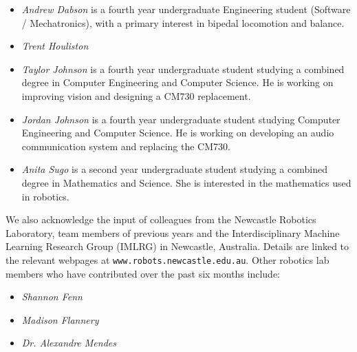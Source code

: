 \documentclass{llncs}
\begin{document}
\begin{itemize}
\item \emph{Andrew Dabson} is a fourth year undergraduate Engineering student (Software / Mechatronics), with a primary interest in bipedal locomotion and balance.

\item \emph{Trent Houliston} 

\item \emph{Taylor Johnson} is a fourth year undergraduate student studying a combined degree in Computer Engineering and Computer Science. He is working on improving vision and designing a CM730 replacement.

\item \emph{Jordan Johnson} is a fourth year undergraduate student studying Computer Engineering and Computer Science. He is working on developing an audio communication system and replacing the CM730.

\item \emph{Anita Sugo} is a second year undergraduate student studying a combined degree in Mathematics and Science. She is interested in the mathematics used in robotics.

\end{itemize}

We also acknowledge the input of colleagues from the Newcastle Robotics Laboratory, team members of previous years
and the Interdisciplinary Machine Learning Research Group (IMLRG) in
Newcastle, Australia. Details are linked to the relevant webpages at
\texttt{www.robots.newcastle.edu.au}. Other robotics lab members who have contributed over the past six months include:
\begin{itemize}

\item \emph{Shannon Fenn} %

\item \emph{Madison Flannery} %

\item \emph{Dr. Alexandre Mendes} %

\end{itemize}
\end{document}
